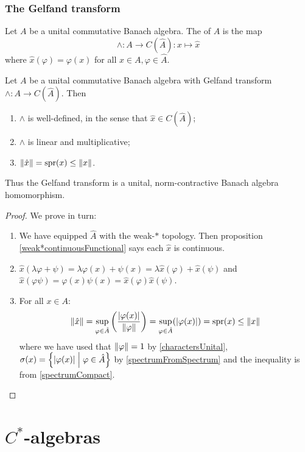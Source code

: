 \subsection{The Gelfand transform}
\begin{definition}
Let $A$ be a unital commutative Banach algebra. The  of $A$ is the map
\[ \wedge : A\to C(\hat{A}): x\mapsto \hat{x} \]
where $\hat{x}(\varphi) = \varphi(x)$ for all $x\in A, \varphi\in\hat{A}$.
\end{definition}
\begin{lemma} \label{GelfandTransformHomomorphism}
Let $A$ be a unital commutative Banach algebra with Gelfand transform $\wedge : A\to C(\hat{A})$. Then
\begin{enumerate}
\item $\wedge$ is well-defined, in the sense that $\hat{x} \in C(\hat{A})$;
\item $\wedge$ is linear and multiplicative;
\item $\lVert\hat{x}\rVert = \operatorname{spr}(x) \leq \lVert x\rVert$.
\end{enumerate}
Thus the Gelfand transform is a unital, norm-contractive Banach algebra homomorphism.
\end{lemma}
\begin{proof}
We prove in turn:
\begin{enumerate}
\item We have equipped $\hat{A}$ with the weak-$*$ topology. Then proposition \ref{weak*continuousFunctional} says each $\hat{x}$ is continuous.
\item $\hat{x}(\lambda \varphi + \psi) = \lambda \varphi(x) + \psi(x) = \lambda\hat{x}(\varphi) + \hat{x}(\psi)$ and $\hat{x}(\varphi\psi) = \varphi(x)\psi(x) = \hat{x}(\varphi)\hat{x}(\psi)$.
\item For all $x\in A$:
\[ \lVert\hat{x}\rVert = \sup_{\varphi\in\hat{A}}\left( \frac{|\varphi(x)|}{\lVert\varphi\rVert} \right) = \sup_{\varphi\in\hat{A}}(|\varphi(x)|) = \operatorname{spr}(x) \leq \lVert x\rVert \]
where we have used that $\lVert\varphi\rVert = 1$ by \ref{charactersUnital}, $\sigma(x) = \left\{ |\varphi(x)| \;\middle|\; \varphi\in\hat{A} \right\}$ by \ref{spectrumFromSpectrum} and the inequality is from \ref{spectrumCompact}.
\end{enumerate}
\end{proof}





\chapter{$C^*$-algebras}

